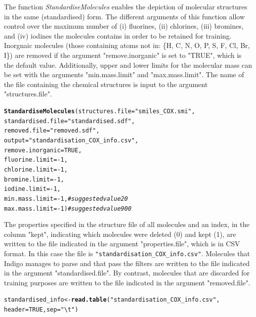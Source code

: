 \documentclass[twoside,a4wide,12pt]{article}\usepackage[]{graphicx}\usepackage[]{color}
\makeatletter
\newcommand{\hlnum}[1]{\textcolor[rgb]{0.686,0.059,0.569}{#1}}%
\newcommand{\hlstr}[1]{\textcolor[rgb]{0.192,0.494,0.8}{#1}}%
\newcommand{\hlcom}[1]{\textcolor[rgb]{0.678,0.584,0.686}{\textit{#1}}}%
\newcommand{\hlopt}[1]{\textcolor[rgb]{0,0,0}{#1}}%
\newcommand{\hlstd}[1]{\textcolor[rgb]{0.345,0.345,0.345}{#1}}%
\newcommand{\hlkwb}[1]{\textcolor[rgb]{0.69,0.353,0.396}{#1}}%
\newcommand{\hlkwc}[1]{\textcolor[rgb]{0.333,0.667,0.333}{#1}}%
\newcommand{\hlkwd}[1]{\textcolor[rgb]{0.737,0.353,0.396}{\textbf{#1}}}%
\newenvironment{kframe}{%
 \def\at@end@of@kframe{}%
 \ifinner\ifhmode%
  \def\at@end@of@kframe{\end{minipage}}%
  \begin{minipage}{\columnwidth}%
 \fi\fi%
 \def\FrameCommand##1{\hskip\@totalleftmargin \hskip-\fboxsep
 \colorbox{shadecolor}{##1}\hskip-\fboxsep
     \hskip-\linewidth \hskip-\@totalleftmargin \hskip\columnwidth}%
 \MakeFramed {\advance\hsize-\width
   \@totalleftmargin\z@ \linewidth\hsize
   \@setminipage}}%
 {\par\unskip\endMakeFramed%
 \at@end@of@kframe}
\newenvironment{knitrout}{}{} %
\makeatother
\begin{document}
The function {\it StandardiseMolecules} enables the depiction of molecular structures in the same (standardised) form.
The different arguments of this function allow control over the maximum number of (i) fluorines, (ii) chlorines,
(iii) bromines, and (iv) iodines the molecules contains in order to be retained for training.
Inorgnaic molecules (those containing atoms not in: \{H, C, N, O, P, S, F, Cl, Br, I\}) are removed if the argument "remove.inorganic" is set to "TRUE", which is the default value.
Additionally, upper and lower limits for the molecular mass can be set with the arguments "min.mass.limit" and "max.mass.limit".
The name of the file containing the chemical structures is input to the argument "structures.file".
\begin{knitrout}
\color{fgcolor}\begin{kframe}
\begin{alltt}
\hlkwd{StandardiseMolecules}\hlstd{(}\hlkwc{structures.file}\hlstd{=}\hlstr{"smiles_COX.smi"}\hlstd{,}
\hlkwc{standardised.file}\hlstd{=}\hlstr{"standardised.sdf"}\hlstd{,}
\hlkwc{removed.file}\hlstd{=}\hlstr{"removed.sdf"}\hlstd{,}
\hlkwc{output}\hlstd{=}\hlstr{"standardisation_COX_info.csv"}\hlstd{,}
\hlkwc{remove.inorganic}\hlstd{=}\hlnum{TRUE}\hlstd{,}
\hlkwc{fluorine.limit}\hlstd{=}\hlopt{-}\hlnum{1}\hlstd{,}
\hlkwc{chlorine.limit}\hlstd{=}\hlopt{-}\hlnum{1}\hlstd{,}
\hlkwc{bromine.limit}\hlstd{=}\hlopt{-}\hlnum{1}\hlstd{,}
\hlkwc{iodine.limit}\hlstd{=}\hlopt{-}\hlnum{1}\hlstd{,}
\hlkwc{min.mass.limit}\hlstd{=}\hlopt{-}\hlnum{1}\hlstd{,} \hlcom{#suggested value 20}
\hlkwc{max.mass.limit}\hlstd{=}\hlopt{-}\hlnum{1}\hlstd{)} \hlcom{#suggested value  900}
\end{alltt}
\end{kframe}
\end{knitrout}

The properties specified in the structure file of all molecules and an index, in the column "kept", indicating which molecules were deleted (0) and kept (1),
are written to the file indicated in the argument "properties.file", which is in CSV format.
In this case the file is \verb|"standardisation_COX_info.csv"|.
Molecules that Indigo manages to parse and that pass the filters are written to the file indicated in the argument "standardised.file".
By contrast, molecules that are discarded for training purposes are written to the file indicated in the argument "removed.file".

\begin{knitrout}
\color{fgcolor}\begin{kframe}
\begin{alltt}
\hlstd{standardised_info} \hlkwb{<-} \hlkwd{read.table}\hlstd{(}\hlstr{"standardisation_COX_info.csv"}\hlstd{,}
    \hlkwc{header} \hlstd{=} \hlnum{TRUE}\hlstd{,} \hlkwc{sep} \hlstd{=} \hlstr{"\textbackslash{}t"}\hlstd{)}
\end{alltt}
\end{kframe}
\end{knitrout}
\end{document}
